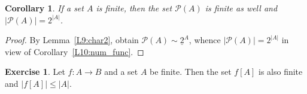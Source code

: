 \documentclass[12pt,notitlepage]{article}
\theoremstyle{plain}
\newtheorem{lemma}[thm]{Lemma}
\newtheorem{corr}[thm]{Corollary}
\theoremstyle{definition}
\newtheorem{exc}[thm]{Exercise}
\newtheorem{exm}[thm]{Example}
\theoremstyle{plain}
\newcommand{\N}{\mathbb{N}}
\renewcommand{\setminus}{\smallsetminus}
\newcommand{\void}{\varnothing}
\newcommand{\mP}{\mathcal{P}}
\newcommand{\rst}{\mathop{\upharpoonright}}
\newcommand{\ul}[1]{\underline{#1}}
\newcommand{\1}{\mathbf{1}}
\newcommand{\0}{\mathbf{0}}
\begin{document}
\begin{corr}\label{L10:num_pow}
If a set $A$ is finite, then the set $\mP(A)$ is finite as well and $|\mP(A)| = 2^{|A|}$.
\end{corr}
\begin{proof}
By Lemma~\ref{L9:char2}, obtain $\mP(A) \sim \ul{2}^A$, whence $|\mP(A)| = 2^{|A|}$ in view of Corollary~\ref{L10:num_func}.
\end{proof}
%
%
%


\begin{exc}\label{L10:fin_img}
Let $f\colon A \to B$ and a set $A$ be finite. Then the set $f[A]$ is also finite and $|f[A]| \leq |A|$.
\end{exc}
\end{document}
